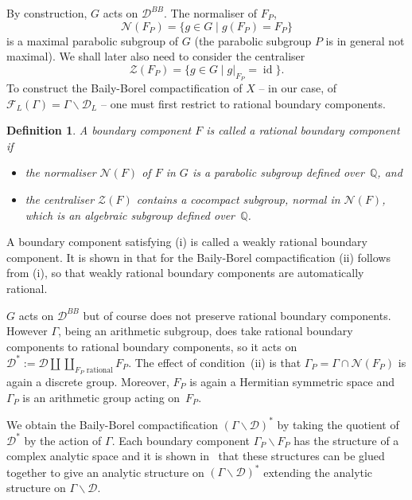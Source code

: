 \documentclass[a4paper,11pt]{article}
\newtheorem{definition}[lemma]{Definition}
\newcommand{\QQ}{\mathbb Q}
\renewcommand{\cD}{\mathcal D}
\newcommand{\cF}{\mathcal F}
\newcommand{\cN}{\mathcal N}
\newcommand{\cZ}{\mathcal Z}
\newcommand{\id}{\mathop{\mathrm {id}}\nolimits}
\begin{document}
By construction, $G$ acts on $\cD^{BB}$. The normaliser of $F_P$,
\begin{equation}\label{normaliser}
\cN(F_P)=\{g \in G\mid g(F_P)=F_P\}
\end{equation}
is a maximal parabolic subgroup of $G$ (the parabolic subgroup $P$ is
in general not maximal). We shall later also need to consider the
centraliser
\begin{equation}\label{centraliser}
\cZ(F_P)=\{g \in G\mid g|_{F_P}=\id\}.
\end{equation}
To construct the Baily-Borel compactification of $X$ -- in our case,
of $\cF_L(\Gamma)=\Gamma\backslash \cD_L$ -- one must first
restrict to rational boundary components.
\begin{definition}\label{def:ratbdycompt}
A boundary component $F$ is called a \emph{rational boundary
  component} if
\begin{itemize}
\item[(i)] the normaliser $\cN(F)$ of $F$ in $G$ is a parabolic
  subgroup defined over~$\QQ$, and
\item[(ii)] the centraliser $\cZ(F)$ contains a cocompact subgroup,
  normal in $\cN(F)$, which is an algebraic subgroup defined
  over~$\QQ$.
\end{itemize}
\end{definition}
A boundary component satisfying (i) is called a weakly rational
boundary component. It is shown in \cite[Theorem~3.7]{BB} that for the
Baily-Borel compactification (ii) follows from (i), so that weakly
rational boundary components are automatically rational.

$G$ acts on $\cD^{BB}$ but of course does not preserve rational boundary
components. However $\Gamma$, being an arithmetic subgroup, does take
rational boundary components to rational boundary components, so it
acts on $\cD^*:=\cD\amalg\coprod_{F_P\text{ rational}}F_P$. The effect of
condition~(ii) is that $\Gamma_P=\Gamma\cap \cN(F_P)$ is again a
discrete group. Moreover, $F_P$ is again a Hermitian symmetric space
and $\Gamma_P$ is an arithmetic group acting on~$F_P$.

We obtain the Baily-Borel compactification $(\Gamma\backslash\cD)^*$
by taking the quotient of $\cD^*$ by the action of $\Gamma$. Each
boundary component $\Gamma_P\backslash F_P$ has the structure of a
complex analytic space and it is shown in~\cite{BB} that these
structures can be glued together to give an analytic structure on
$(\Gamma\backslash \cD)^*$ extending the analytic structure on
$\Gamma\backslash \cD$.
\end{document}
